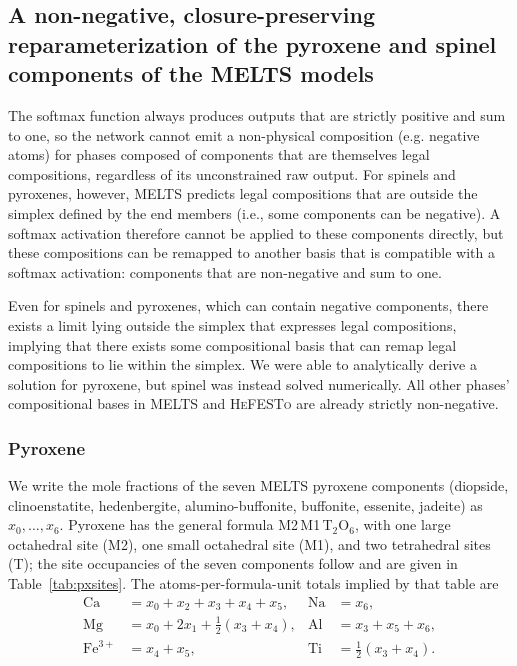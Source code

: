 \subsection{A non-negative, closure-preserving reparameterization of the
pyroxene and spinel components of the \textsc{MELTS} models}
\label{sec:pxsp}

The softmax function always produces outputs that are strictly positive and sum to one, so the network
cannot emit a non-physical composition (e.g. negative atoms) for phases composed of components that are themselves 
legal compositions, regardless of its unconstrained raw output. For spinels and pyroxenes, however,
\textsc{MELTS} predicts legal compositions that are outside the simplex defined by the end members 
(i.e., some components can be negative). A softmax activation therefore cannot be applied to these components directly, 
but these compositions can be remapped to another basis that is compatible with a softmax activation: 
components that are non-negative and sum to one.

Even for spinels and pyroxenes, which can contain negative components, there exists a limit lying outside
the simplex that expresses legal compositions, implying that there exists some compositional basis that 
can remap legal compositions to lie within the simplex. We were able to analytically derive a solution 
for pyroxene, but spinel was instead solved numerically. All other phases' compositional bases in 
\textsc{MELTS} and \textsc{HeFESTo} are already strictly non-negative.

\subsubsection{Pyroxene} We write the mole fractions of the seven \textsc{MELTS} pyroxene
components (diopside, clinoenstatite, hedenbergite, alumino-buffonite, buffonite,
essenite, jadeite) as $x_0,\dots,x_6$. Pyroxene has the general formula
M2\,M1\,T$_2$O$_6$, with one large octahedral site (M2), one small octahedral site
(M1), and two tetrahedral sites (T); the site occupancies of the seven components
follow \citet{sackghiorso1994} and are given in Table~\ref{tab:pxsites}. The
atoms-per-formula-unit totals implied by that table are
\begin{align}
  \mathrm{Ca} &= x_0+x_2+x_3+x_4+x_5, &
  \mathrm{Na} &= x_6, \nonumber\\
  \mathrm{Mg} &= x_0+2x_1+\tfrac12(x_3+x_4), &
  \mathrm{Al} &= x_3+x_5+x_6, \label{eq:pxapfu}\\
  \mathrm{Fe}^{3+} &= x_4+x_5, &
  \mathrm{Ti} &= \tfrac12(x_3+x_4). \nonumber
\end{align}


